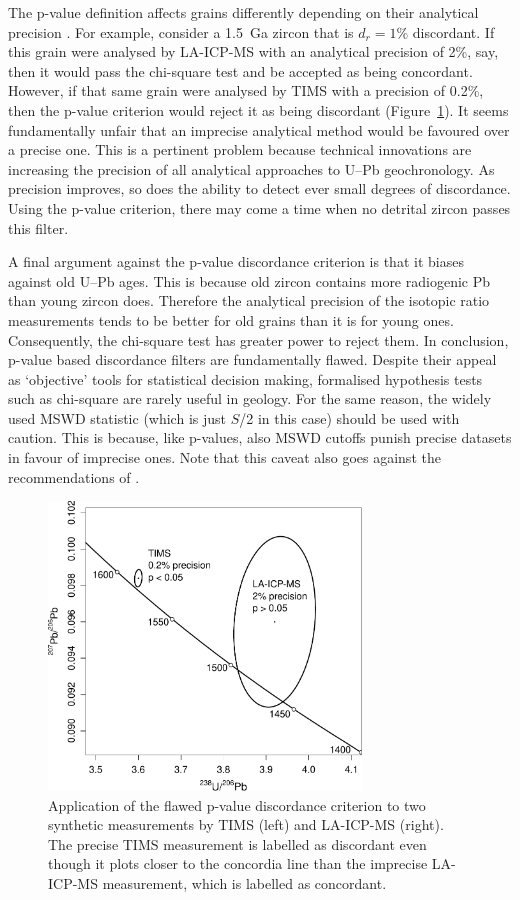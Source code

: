 \documentclass[gchron, manuscript]{copernicus}
\begin{document}
The p-value definition affects grains differently depending on their
analytical precision \citep{nemchin2005}. For example, consider a
1.5~Ga zircon that is $d_r=1\%$ discordant. If this grain were
analysed by LA-ICP-MS with an analytical precision of 2\%, say, then
it would pass the chi-square test and be accepted as being
concordant. However, if that same grain were analysed by TIMS with a
precision of 0.2\%, then the p-value criterion would reject it as
being discordant (Figure~\ref{fig:TIMSvsLAICPMS}). It seems
fundamentally unfair that an imprecise analytical method would be
favoured over a precise one. This is a pertinent problem because
technical innovations are increasing the precision of all analytical
approaches to U--Pb geochronology.  As precision improves, so does the
ability to detect ever small degrees of discordance. Using the p-value
criterion, there may come a time when no detrital zircon passes this
filter.

A final argument against the p-value discordance criterion is that it
biases against old U--Pb ages. This is because old zircon contains
more radiogenic Pb than young zircon does. Therefore the analytical
precision of the isotopic ratio measurements tends to be better for
old grains than it is for young ones. Consequently, the chi-square
test has greater power \citep[\emph{sensu}][]{cohen1992} to reject
them. In conclusion, p-value based discordance filters are
fundamentally flawed. Despite their appeal as `objective' tools for
statistical decision making, formalised hypothesis tests such as
chi-square are rarely useful in geology. For the same reason, the
widely used MSWD \citep[Mean Square of the Weighted
  Deviates,][]{mcintyre1966} statistic (which is just $S$/2 in this
case) should be used with caution. This is because, like p-values,
also MSWD cutoffs punish precise datasets in favour of imprecise
ones. Note that this caveat also goes against the recommendations of
\citet{spencer2016}.

\begin{figure}[t]
  \includegraphics[width=8.3cm]{TIMSvsICPMS.pdf}
  \caption{Application of the flawed p-value discordance criterion
    to two synthetic measurements by TIMS (left) and LA-ICP-MS
    (right).  The precise TIMS measurement is labelled as discordant
    even though it plots closer to the concordia line than the
    imprecise LA-ICP-MS measurement, which is labelled as
    concordant.
  }
  \label{fig:TIMSvsLAICPMS}
\end{figure}
\end{document}
